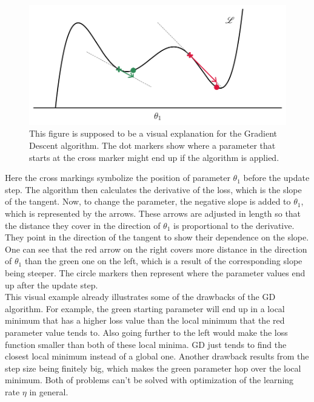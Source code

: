 \begin{figure}
	\centering
	\includegraphics[width = 14cm]{text/MachineLearningBasics/plots/sgd_plot.pdf}
	\caption{This figure is supposed to be a visual explanation for the Gradient Descent algorithm. The dot markers show where a parameter that starts at the cross marker might end up if the algorithm is applied.}
	\label{fig:gd_explanation_plot}
\end{figure}
Here the cross markings symbolize the position of parameter $\theta_1$ before the update step. The algorithm then calculates the derivative of the loss, which is the slope of the tangent. Now, to change the parameter, the negative slope is added to $\theta_1$, which is represented by the arrows. These arrows are adjusted in length so that the distance they cover in the direction of $\theta_1$ is proportional to the derivative. They point in the direction of the tangent to show their dependence on the slope. One can see that the red arrow on the right covers more distance in the direction of $\theta_1$ than the green one on the left, which is a result of the corresponding slope being steeper. The circle markers then represent where the parameter values end up after the update step.\\
This visual example already illustrates some of the drawbacks of the GD algorithm. For example, the green starting parameter will end up in a local minimum that has a higher loss value than the local minimum that the red parameter value tends to. Also going further to the left would make the loss function smaller than both of these local minima. GD just tends to find the closest local minimum instead of a global one. Another drawback results from the step size being finitely big, which makes the green parameter hop over the local minimum. Both of problems can't be solved with optimization of the learning rate $\eta$ in general.

